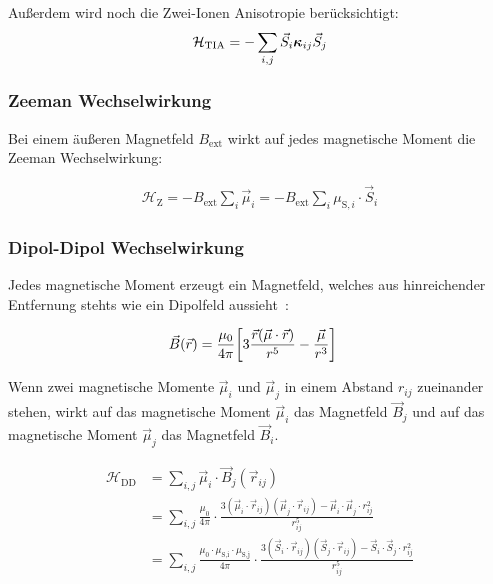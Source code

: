 \documentclass[main.tex]{subfiles}
\begin{document}
Außerdem wird noch die Zwei-Ionen Anisotropie berücksichtigt:
\begin{align}
	\mathcal{H}_{\text{TIA}} = -\sum_{i,j} \vec{S}_i \bm{\mathrm{\kappa}}_{ij} \vec{S}_j\label{eq:hamilton-tia}
\end{align}
\subsubsection*{Zeeman Wechselwirkung}
Bei einem äußeren Magnetfeld \(B_\text{ext}\) wirkt auf jedes magnetische Moment die Zeeman Wechselwirkung:

\begin{align}
	\mathcal{H}_{\text{Z}} = - B_\text{ext} \sum_{i} \vec{\mu}_i = 
	- B_\text{ext} \sum_{i} \mu_{\text{S},i} \cdot \vec{S}_i\label{eq:hamilton-zeeman}
\end{align}


\subsubsection*{Dipol-Dipol Wechselwirkung}

Jedes magnetische Moment erzeugt ein Magnetfeld, welches aus hinreichender
Entfernung stehts wie ein Dipolfeld aussieht~\cite{Nolting-3-elektrodynamik}:

\begin{align}
	\vec{B}(\vec{r}) & = \frac{\mu_0}{4\pi} \qty[3 \frac{\vec{r}(\vec{\mu} \cdot
			\vec{r})}{r^5} - \frac{\vec{\mu}}{r^3}]\label{eq:dipolmoment}
\end{align}

Wenn zwei magnetische Momente \(\vec{\mu}_i\) und \(\vec{\mu}_j\) in einem Abstand \(r_{ij}\) zueinander stehen, wirkt auf das magnetische Moment \(\vec{\mu}_i\) das Magnetfeld \(\vec{B}_j\) und auf das magnetische Moment \(\vec{\mu}_j\) das Magnetfeld \(\vec{B}_i\).



\begin{align}
	\mathcal{H}_{\text{DD}} 
	& = \sum_{i,j} \vec{\mu}_i \cdot \vec{B}_j(\vec{r}_{ij}) \nonumber \\
	& = \sum_{i,j} \frac{\mu_0}{4\pi}
	\cdot \frac{3(\vec{\mu}_i \cdot \vec{r}_{ij})(\vec{\mu}_j \cdot \vec{r}_{ij})
	- \vec{\mu}_i \cdot \vec{\mu}_j \cdot r_{ij}^2}{r_{ij}^5} \nonumber \\
	& = \sum_{i,j} \frac{\mu_0 \cdot \mu_{\text{S,i}} \cdot \mu_{\text{S,j}}}{4\pi}
	\cdot \frac{3(\vec{S}_i \cdot \vec{r}_{ij})(\vec{S}_j \cdot \vec{r}_{ij})
	- \vec{S}_i \cdot \vec{S}_j \cdot r_{ij}^2}{r_{ij}^5}\label{eq:hamilton-dd}
\end{align}
\end{document}
